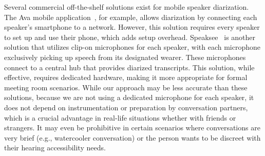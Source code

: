 Several commercial off-the-shelf solutions exist for mobile speaker diarization. The Ava mobile application~\cite{ava}, for example, allows diarization by connecting each speaker's smartphone to a network. However, this solution requires every speaker to set up and use their phone, which adds setup overhead. Speaksee~\cite{speaksee} is another solution that utilizes clip-on microphones for each speaker, with each microphone exclusively picking up speech from its designated wearer. These microphones connect to a central hub that provides diarized transcripts. This solution, while effective, requires dedicated hardware, making it more appropriate for formal meeting room scenarios.  While our approach may be less accurate than these solutions, because we are not using a dedicated microphone for each speaker, it does not depend on instrumentation or preparation by conversation partners, which is a crucial advantage in real-life situations whether with friends or strangers. It may even be prohibitive in certain scenarios where conversations are very brief (e.g., watercooler conversation) or the person wants to be discreet with their hearing accessibility needs.








